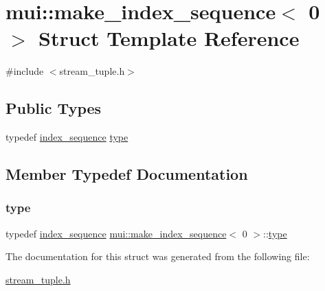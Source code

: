 \hypertarget{structmui_1_1make__index__sequence_3_010_01_4}{}\section{mui\+:\+:make\+\_\+index\+\_\+sequence$<$ 0 $>$ Struct Template Reference}
\label{structmui_1_1make__index__sequence_3_010_01_4}


{\ttfamily \#include $<$stream\+\_\+tuple.\+h$>$}

\subsection*{Public Types}
\begin{DoxyCompactItemize}
\item 
typedef \hyperlink{structmui_1_1index__sequence}{index\+\_\+sequence} \hyperlink{structmui_1_1make__index__sequence_3_010_01_4_a0f9c3c9185886604e73df2c025e07d40}{type}
\end{DoxyCompactItemize}


\subsection{Member Typedef Documentation}
\mbox{\label{structmui_1_1make__index__sequence_3_010_01_4_a0f9c3c9185886604e73df2c025e07d40}} 
\subsubsection{\texorpdfstring{type}{type}}
{\footnotesize\ttfamily typedef \hyperlink{structmui_1_1index__sequence}{index\+\_\+sequence} \hyperlink{structmui_1_1make__index__sequence}{mui\+::make\+\_\+index\+\_\+sequence}$<$ 0 $>$\+::\hyperlink{structmui_1_1make__index__sequence_3_010_01_4_a0f9c3c9185886604e73df2c025e07d40}{type}}



The documentation for this struct was generated from the following file\+:\begin{DoxyCompactItemize}
\item 
\hyperlink{stream__tuple_8h}{stream\+\_\+tuple.\+h}\end{DoxyCompactItemize}
